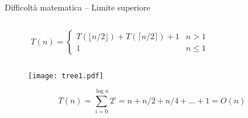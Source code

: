 \begin{frame}{Difficoltà matematica -- Limite superiore}

\vspace{-6pt}
\begin{mybox}
\begin{columns}[c]
\begin{column}{0.64\textwidth}
\[
T(n) = \begin{cases}
      T( \lfloor n/2 \rfloor )  + T( \lceil n/2 \rceil) + 1 & n > 1 \\
     1 & n \leq 1
  \end{cases}
\]
\end{column}
\begin{column}{0.35\textwidth}
\end{column}
\end{columns}
\end{mybox}


\begin{overprint}
\begin{figure}
	\texttt{[image: tree1.pdf]}
\end{figure}
\[
T(n) = \sum_{i=0}^{\log n} 2^i = n + n/2 + n/4 + \ldots + 1 = O(n)
\]
\end{overprint}

\end{frame}

